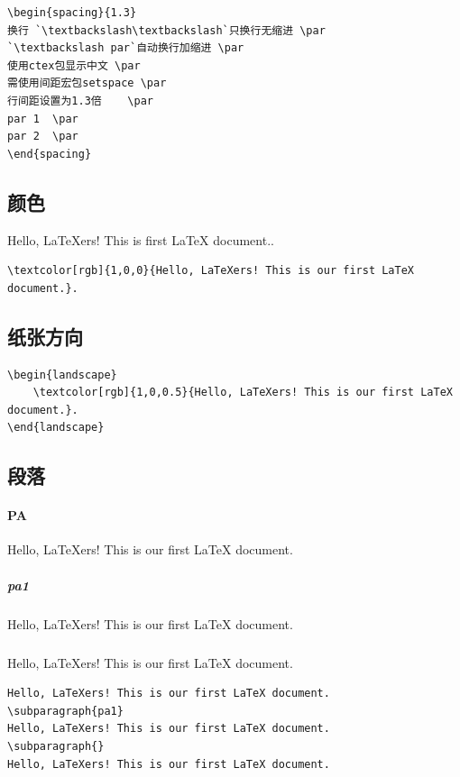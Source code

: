 \documentclass[a4paper,twoside,12pt]{article}
\begin{document}
\begin{lstlisting}
\begin{spacing}{1.3} 
换行 `\textbackslash\textbackslash`只换行无缩进 \par
`\textbackslash par`自动换行加缩进 \par
使用ctex包显示中文 \par
需使用间距宏包setspace \par
行间距设置为1.3倍    \par
par 1  \par
par 2  \par
\end{spacing}
\end{lstlisting}

\subsection{颜色}
\textcolor[rgb]{1,0,0}{Hello, LaTeXers! This is  first LaTeX document.}.

\begin{lstlisting}
\textcolor[rgb]{1,0,0}{Hello, LaTeXers! This is our first LaTeX document.}.
\end{lstlisting}

\subsection{纸张方向}
\begin{lstlisting}
\begin{landscape}
    \textcolor[rgb]{1,0,0.5}{Hello, LaTeXers! This is our first LaTeX document.}.
\end{landscape}
\end{lstlisting}

\subsection{段落}

\paragraph[]{PA}
Hello, LaTeXers! This is our first LaTeX document.
\subparagraph{pa1}
Hello, LaTeXers! This is our first LaTeX document.
\subparagraph{}
Hello, LaTeXers! This is our first LaTeX document.

\begin{lstlisting}
Hello, LaTeXers! This is our first LaTeX document.
\subparagraph{pa1}
Hello, LaTeXers! This is our first LaTeX document.
\subparagraph{}
Hello, LaTeXers! This is our first LaTeX document.
\end{lstlisting}
\end{document}
